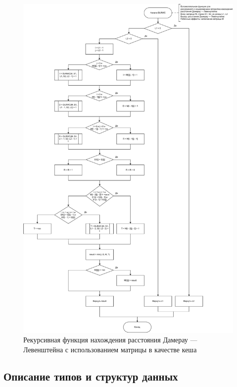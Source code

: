 \begin{figure}[H]
	\centering
	\includegraphics[scale=0.5]{img/dlrwch.pdf}
	\caption{Рекурсивная функция нахождения расстояния Дамерау --- Левенштейна с использованием матрицы в качестве кеша}
	\label{fig:dlrwch}
\end{figure}

\subsection{Описание типов и структур данных}

